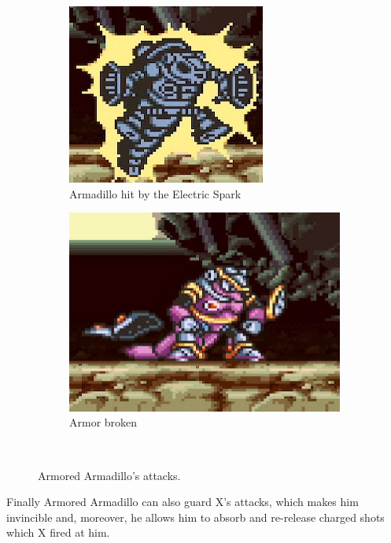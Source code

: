 \begin{figure}[htp]
	\ContinuedFloat
	\centering
	\begin{subfigure}[t]{0.4\textwidth}
		\centering
		\includegraphics[width=\linewidth]{figures/X1/Armored_armadillo/Armadillo_shock_1.jpg}
		\caption{Armadillo hit by the Electric Spark}
	\end{subfigure}
	\begin{subfigure}[t]{0.4\textwidth}
		\centering
		\includegraphics[width=\linewidth]{figures/X1/Armored_armadillo/Armadillo_shock_2.jpg}
		\caption{Armor broken}
	\end{subfigure}\\
	\caption{Armored Armadillo's attacks.}
\end{figure}
Finally Armored Armadillo can also guard X's attacks, which makes him invincible and, moreover, he allows him to absorb and re-release charged shots which X fired at him.  

